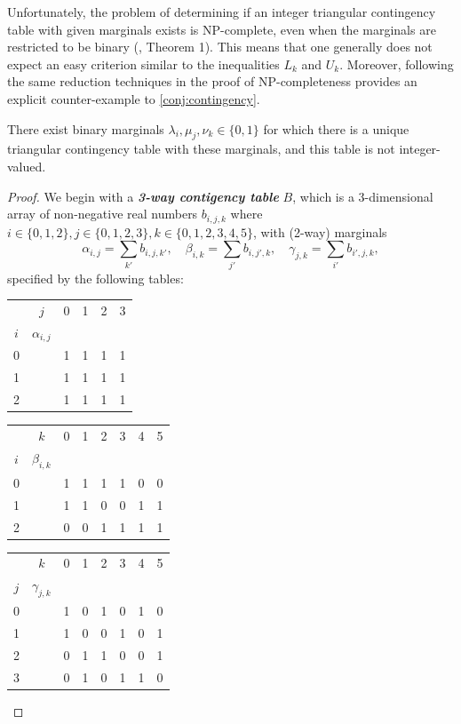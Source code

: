 \documentclass[letterpaper,reqno,11pt]{amsart}
\newcommand{\bfemph}[1]{\textbf{\emph{#1}}}
\begin{document}
Unfortunately, the problem of determining if an integer triangular contingency table with given marginals exists is NP-complete, even when the marginals are restricted to be binary (\cite{BDGV2008}, Theorem 1). This means that one generally does not expect an easy criterion similar to the inequalities $L_k$ and $U_k$. Moreover, following the same reduction techniques in the proof of NP-completeness provides an explicit counter-example to \cref{conj:contingency}.

\begin{proposition}
    There exist binary marginals $\lambda_i, \mu_j, \nu_k \in \{0, 1\}$ for which there is a unique triangular contingency table with these marginals, and this table is not integer-valued.
\end{proposition}

\begin{proof}
    We begin with a \bfemph{3-way contigency table} $B$, which is a 3-dimensional array of non-negative real numbers $b_{i,j,k}$ where $i\in \{0, 1, 2\}, j\in \{0, 1, 2, 3\}, k\in \{0, 1, 2, 3, 4, 5\}$, with (2-way) marginals \[\alpha_{i,j} = \sum_{k'} b_{i,j,k'}, \quad \beta_{i,k} = \sum_{j'} b_{i,j',k}, \quad \gamma_{j,k} = \sum_{i'} b_{i',j,k},\] specified by the following tables:

    \begin{table}[h!]
    \begin{tabular}{cc|cccc}
     & $j$ & 0 & 1 & 2 & 3 \\
    $i$ & $\alpha_{i,j}$ &  &  &  &  \\ \hline
    0 &  & 1 & 1 & 1 & 1 \\
    1 &  & 1 & 1 & 1 & 1 \\
    2 &  & 1 & 1 & 1 & 1
    \end{tabular} \qquad
    \begin{tabular}{cc|cccccc}
     & $k$ & 0 & 1 & 2 & 3 & 4 & 5 \\
    $i$ & $\beta_{i,k}$ &  &  &  &  &  &  \\ \hline
    0 &  & 1 & 1 & 1 & 1 & 0 & 0 \\
    1 &  & 1 & 1 & 0 & 0 & 1 & 1 \\
    2 &  & 0 & 0 & 1 & 1 & 1 & 1
    \end{tabular} \qquad
    \begin{tabular}{cc|cccccc}
     & $k$ & 0 & 1 & 2 & 3 & 4 & 5 \\
    $j$ & $\gamma_{j,k}$ &  &  &  &  &  &  \\ \hline
    0 &  & 1 & 0 & 1 & 0 & 1 & 0 \\
    1 &  & 1 & 0 & 0 & 1 & 0 & 1 \\
    2 &  & 0 & 1 & 1 & 0 & 0 & 1 \\
    3 &  & 0 & 1 & 0 & 1 & 1 & 0
    \end{tabular}
    \end{table}


\end{proof}
\end{document}
